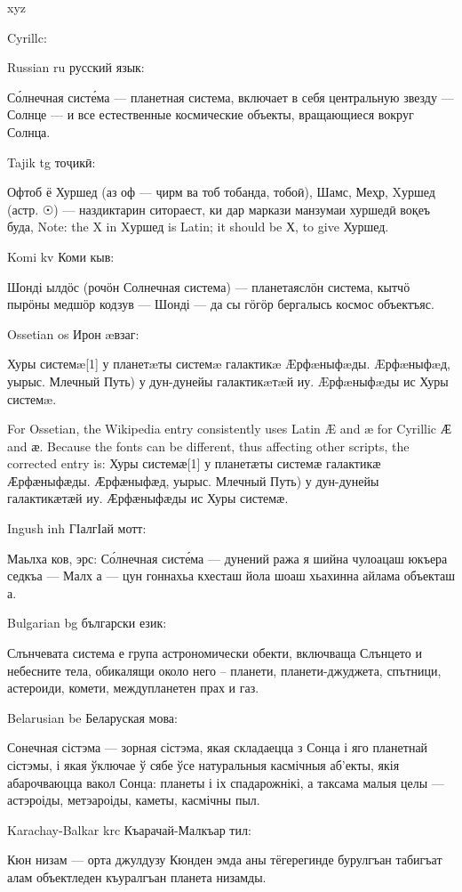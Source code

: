 \documentclass{article}
\begin{document}
\begin{xuchare}
xyz

Cyrillc:

Russian ru русский язык: 

Со́лнечная систе́ма — планетная система, включает в себя центральную звезду — Солнце — и все естественные космические объекты, вращающиеся вокруг Солнца.

Tajik tg тоҷикӣ: 
   
Офтоб ё Хуршед (аз оф — ҷирм ва тоб тобанда, тобоӣ), Шамс, Меҳр, Xуршед (астр. ☉) — наздиктарин ситораест, ки дар маркази манзумаи хуршедӣ воқеъ буда, Note: the X in Xуршед is Latin; it should be Х, to give Хуршед.

Komi kv Коми кыв:

Шонді ылдӧс (рочӧн Солнечная система) — планетаяслӧн система, кытчӧ пырӧны медшӧр кодзув — Шонді — да сы гӧгӧр бергалысь космос объектъяс.

Ossetian os Ирон æвзаг:

Хуры системæ[1] у планетæты системæ галактикæ Æрфæныфæды. 
Æрфæныфæд, уырыс. Млечный Путь) у дун-дунейы галактикæтæй иу. Æрфæныфæды ис Хуры системæ. 

For Ossetian, the Wikipedia entry consistently uses Latin Æ and æ for Cyrillic Ӕ and ӕ. Because the fonts can be different, thus affecting other scripts, the corrected entry is: Хуры системӕ[1] у планетӕты системӕ галактикӕ Ӕрфӕныфӕды. 
Ӕрфӕныфӕд, уырыс. Млечный Путь) у дун-дунейы галактикӕтӕй иу. Ӕрфӕныфӕды ис Хуры системӕ. 


Ingush inh ГӀалгӀай мотт:

Маьлха ков, эрс: Со́лнечная систе́ма — дунений ража я шийна чулоацаш юкъера седкъа — Малх а — цун гоннахьа кхесташ йола шоаш хьахинна айлама объекташ а.

Bulgarian bg български език:

Слънчевата система е група астрономически обекти, включваща Слънцето и небесните тела, обикалящи около него – планети, планети-джуджета, спътници, астероиди, комети, междупланетен прах и газ.

Belarusian be Беларуская мова:

Сонечная сістэма — зорная сістэма, якая складаецца з Сонца і яго планетнай сістэмы, і якая ўключае ў сябе ўсе натуральныя касмічныя аб'екты, якія абарочваюцца вакол Сонца: планеты і іх спадарожнікі, а таксама малыя целы — астэроіды, метэароіды, каметы, касмічны пыл.

Karachay-Balkar krc Къарачай-Малкъар тил:

Кюн низам — орта джулдузу Кюнден эмда аны тёгерегинде бурулгъан табигъат алам объектледен къуралгъан планета низамды.


\end{xuchare}
\end{document}
